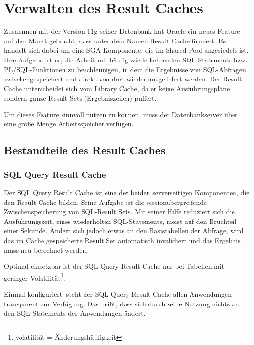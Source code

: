   \chapter{Verwalten des Result Caches}
    \setcounter{page}{1}
    \minitoc
\newpage
    Zusammen mit der Version 11g seiner Datenbank hat Oracle ein neues Feature
    auf den Markt gebracht, dass unter dem Namen Result Cache firmiert. Es
    handelt sich dabei um eine SGA-Komponente, die im Shared Pool angesiedelt
    ist. Ihre Aufgabe ist es, die Arbeit mit h\"aufig wiederkehrenden
    SQL-Statements bzw. PL/SQL-Funktionen zu beschleunigen, in dem die
    Ergebnisse von SQL-Abfragen zwischengespeichert und direkt von dort wieder
    ausgeliefert werden. Der Result Cache unterscheidet sich vom Library Cache,
    da er keine Ausf\"uhrungspl\"ane sondern ganze Result Sets (Ergebniszeilen)
    puffert.

    \begin{merke}
      Um dieses Feature sinnvoll nutzen zu k\"onnen, muss der Datenbankserver \"uber eine gro\ss{}e Menge Arbeitsspeicher verf\"ugen.
    \end{merke}
    \section{Bestandteile des Result Caches}
      \subsection{SQL Query Result Cache}
        Der SQL Query Result Cache ist eine der beiden serverseitigen Komponenten, die den Result Cache bilden. Seine Aufgabe ist die session\"ubergreifende Zwischenspeicherung von SQL-Result Sets. Mit seiner Hilfe reduziert sich die Ausf\"uhrungszeit, eines wiederholten SQL-Statements, meist auf den Bruchteil einer Sekunde. \"Andert sich jedoch etwas an den Basistabellen der Abfrage, wird das im Cache gespeicherte Result Set automatisch invalidiert und das Ergebnis muss neu berechnet werden.
        \begin{merke}
          Optimal einsetzbar ist der SQL Query Result Cache nur bei Tabellen mit geringer Volatilit\"at\footnote{volatilit\"at = \"Anderungsh\"aufigkeit}.
        \end{merke}

        Einmal konfiguriert, steht der SQL Query Result Cache allen Anwendungen transparent zur Verf\"ugung. Das hei\ss{}t, dass sich durch seine Nutzung nichts an den SQL-Statements der Anwendungen \"andert.
